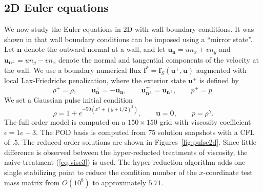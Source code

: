 \documentclass[preprint,10pt]{elsarticle}
\theoremstyle{definition}
\theoremstyle{lemma}
\theoremstyle{theorem}
\theoremstyle{assumption}
\newcommand{\LRp}[1]{\left( #1 \right)}
\newcommand{\note}[1]{{\color{blue}{#1}}}
\begin{document}





\subsection{2D Euler equations}%

We now study the Euler equations in 2D with wall boundary conditions.  It was shown in \cite{svard2014entropy, chen2017entropy} that wall boundary conditions can be imposed using a ``mirror state''.  Let $\bm{n}$ denote the outward normal at a wall, and let $\bm{u}_{\bm{n}} = un_x + vn_y$ and $\bm{u}_{\bm{n}^\perp} = un_y - vn_x$ denote the normal and tangential components of the velocity at the wall.  We use a boundary numerical flux $\bm{f}^* = \bm{f}_S\LRp{\bm{u}^+,\bm{u}}$ augmented with local Lax-Friedrichs penalization, where the exterior state $\bm{u}^+$ is defined by
\[
\rho^+ = \rho, \qquad \bm{u}_{\bm{n}}^+ = -\bm{u}_{\bm{n}}, \qquad \bm{u}_{\bm{n}^\perp}^+ = \bm{u}_{\bm{n}^\perp}, \qquad p^+ = p.  
\]
We set a Gaussian pulse initial condition 
\[
\rho = 1 + e^{-50\LRp{x^2+(y+1/2)^2}}, \qquad \bm{u} = \bm{0}, \qquad p = \rho^{\gamma}.  
\]
The full order model is computed on a $150\times 150$ grid with viscosity coefficient $\epsilon = 1e-3$.  The POD basis is computed from 75 solution snapshots with a CFL of $.5$.  The reduced order solutions are shown in Figures~\ref{fig:pulse2d}.  Since little difference is observed between the hyper-reducted treatments of viscosity, the naive treatment (\ref{eq:visc3}) is used.  The hyper-reduction algorithm adds one single stabilizing point to reduce the condition number of the $x$-coordinate test mass matrix from $O(10^{8})$ to approximately $5.71$.  
\end{document}
